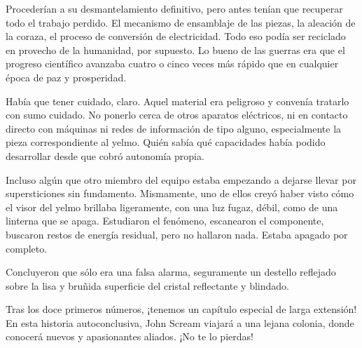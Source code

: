 Procederían a su desmantelamiento definitivo, pero antes tenían que recuperar todo el trabajo perdido. El mecanismo de ensamblaje de las piezas, la aleación de la coraza, el proceso de conversión de electricidad. Todo eso podía ser reciclado en provecho de la humanidad, por supuesto. Lo bueno de las guerras era que el progreso científico avanzaba cuatro o cinco veces más rápido que en cualquier época de paz y prosperidad.

Había que tener cuidado, claro. Aquel material era peligroso y convenía tratarlo con sumo cuidado. No ponerlo cerca de otros aparatos eléctricos, ni en contacto directo con máquinas ni redes de información de tipo alguno, especialmente la pieza correspondiente al yelmo. Quién sabía qué capacidades había podido desarrollar desde que cobró autonomía propia.

Incluso algún que otro miembro del equipo estaba empezando a dejarse llevar por supersticiones sin fundamento. Mismamente, uno de ellos creyó haber visto cómo el visor del yelmo brillaba ligeramente, con una luz fugaz, débil, como de una linterna que se apaga. Estudiaron el fenómeno, escanearon el componente, buscaron restos de energía residual, pero no hallaron nada. Estaba apagado por completo.

Concluyeron que sólo era una falsa alarma, seguramente un destello reflejado sobre la lisa y bruñida superficie del cristal reflectante y blindado.

\begin{next}
    Tras los doce primeros números, ¡tenemos un capítulo especial de larga extensión! En esta historia autoconclusiva, John Scream viajará a una lejana colonia, donde conocerá nuevos y apasionantes aliados. ¡No te lo pierdas!
\end{next}

\endinput
